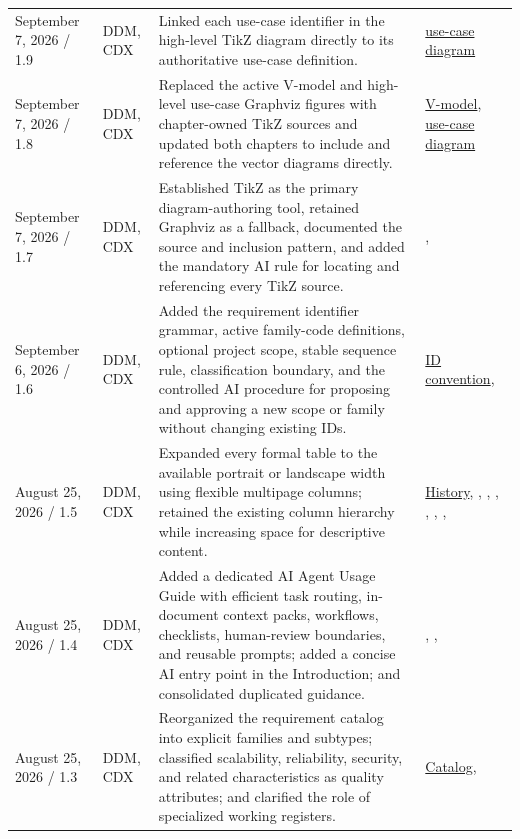 \begin{tabularx}{\linewidth}{L{3.1cm}L{2.2cm}YL{2.0cm}}
September 7, 2026 / 1.9 & DDM, CDX & Linked each use-case identifier in the high-level TikZ diagram directly to its authoritative use-case definition. & \hyperref[Figure:UseCaseDiagram]{use-case diagram}\\
September 7, 2026 / 1.8 & DDM, CDX & Replaced the active V-model and high-level use-case Graphviz figures with chapter-owned TikZ sources and updated both chapters to include and reference the vector diagrams directly. & \hyperref[Figure:VModel]{V-model}, \hyperref[Figure:UseCaseDiagram]{use-case diagram}\\
September 7, 2026 / 1.7 & DDM, CDX & Established TikZ as the primary diagram-authoring tool, retained Graphviz as a fallback, documented the source and inclusion pattern, and added the mandatory AI rule for locating and referencing every TikZ source. & , \\
September 6, 2026 / 1.6 & DDM, CDX & Added the requirement identifier grammar, active family-code definitions, optional project scope, stable sequence rule, classification boundary, and the controlled AI procedure for proposing and approving a new scope or family without changing existing IDs. & \hyperref[Table:RequirementIdentifierConvention]{ID convention}, \\
August 25, 2026 / 1.5 & DDM, CDX & Expanded every formal table to the available portrait or landscape width using flexible multipage columns; retained the existing column hierarchy while increasing space for descriptive content. & \hyperref[Table:DocumentHistory]{History}, , , , , , , \\
August 25, 2026 / 1.4 & DDM, CDX & Added a dedicated AI Agent Usage Guide with efficient task routing, in-document context packs, workflows, checklists, human-review boundaries, and reusable prompts; added a concise AI entry point in the Introduction; and consolidated duplicated guidance. & , , \\
August 25, 2026 / 1.3 & DDM, CDX & Reorganized the requirement catalog into explicit families and subtypes; classified scalability, reliability, security, and related characteristics as quality attributes; and clarified the role of specialized working registers. & \hyperref[Table:RequirementCategoryCatalog]{Catalog}, \\

\end{tabularx}
